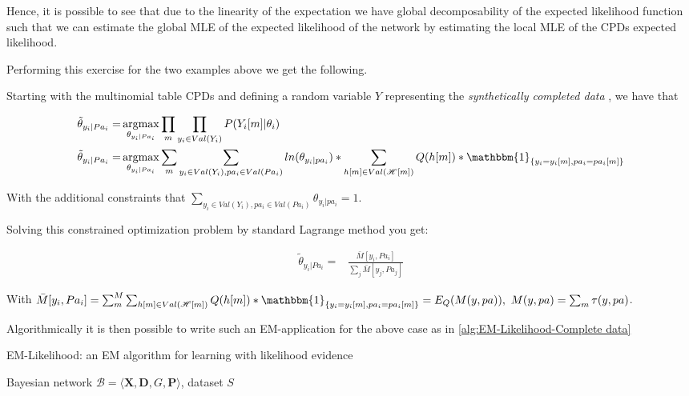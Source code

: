 \documentclass[11pt]{article}
\begin{document}
\begin{article}
Hence, it is possible to see that due to the linearity of the
expectation we have global decomposability of the expected
likelihood function such that we can estimate the global MLE of
the expected likelihood of the network by estimating the local MLE
of the CPDs expected likelihood.

Performing this exercise for the two examples above we get the
following.

Starting with the multinomial table CPDs and defining a random
variable \(Y\) representing the \emph{synthetically completed data} \(<H, D>\),
we have that

\begin{align} \label{eq:solution}
\tilde{\theta}_{y_i | Pa_i} =& \operatorname*{argmax}_{\theta_{y_i | Pa_i}}  \prod_m \prod_{y_i \in Val(Y_i)} P(Y_i[m]|\theta_i) \nonumber  \\
\tilde{\theta}_{y_i | Pa_i} =& \operatorname*{argmax}_{\theta_{y_i | Pa_i}} \sum_m \sum_{y_i \in Val(Y_i), pa_i \in Val(Pa_i)} ln(\theta_{y_i | pa_i}) * \sum_{h[m] \in Val(\mathscr{H}[m])} Q(h[m]) * \mathbbm{1}_{\{y_i = y_i[m], pa_i = pa_i[m]\}}
\end{align}

With the additional constraints that \(\sum_{y_i \in Val(Y_i), pa_i
    \in Val(Pa_i)} \theta_{y_i | pa_i} = 1\).

Solving this constrained optimization problem by standard
Lagrange method you get: 

\begin{align} \label{eq:solution}
\tilde{\theta}_{y_i | Pa_i} =& \frac{\bar{M}[y_i, Pa_i]}{\sum_j \bar{M}[y_j, Pa_j]}
\end{align}

With \(\bar{M}[y_i, Pa_i] = \sum_m^M \sum_{h[m] \in
    Val(\mathscr{H}[m])} Q(h[m]) * \mathbbm{1}_{\{y_i = y_i[m], pa_i =
    pa_i[m]\}} = E_Q(M(y, pa)), \ M(y, pa) = \sum_m \tau(y,pa)\).

Algorithmically it is then possible to write such an EM-application for
the above case as in \ref{alg:EM-Likelihood-Complete data}

\algrenewcommand\algorithmicindent{1.5em}%

\begin{algorithm*}[h!]
\caption{EM-Likelihood: an EM algorithm for learning with likelihood evidence}
\label{alg:EM-Likelihood-Missing-Data}
\vspace{-10pt}
\begin{multicols}{2}
\begin{algorithmic}[1] 
\Require Bayesian network $\mathcal{B}=\langle \mathbf{X},\mathbf{D}, G, \mathbf{P} \rangle$, dataset $S$ 


\end{algorithmic}
\end{multicols}
\end{algorithm*}
\end{article}
\end{document}
